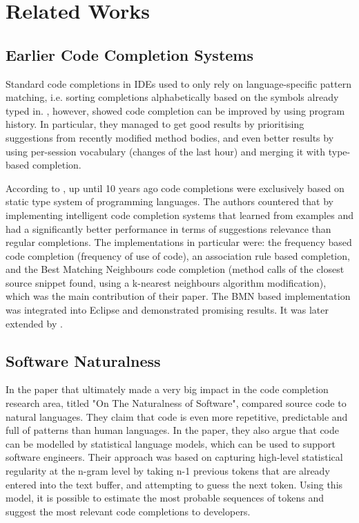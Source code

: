 \chapter{Related Works}
\label{chap:RelatedWorks}

\section{Earlier Code Completion Systems}
\label{sec:RelatedWorks-EarlierSystems}
Standard code completions in IDEs used to only rely on language-specific pattern matching, i.e. sorting completions alphabetically based on the symbols already typed in. \cite{Robb08a}, however, showed code completion can be improved by using program history. In particular, they managed to get good results by prioritising suggestions from recently modified method bodies, and even better results by using per-session vocabulary (changes of the last hour) and merging it with type-based completion.

According to \cite{Bruc09a}, up until 10 years ago code completions were exclusively based on static type system of programming languages. The authors countered that by implementing intelligent code completion systems that learned from examples and had a significantly better performance in terms of suggestions relevance than regular completions. The implementations in particular were: the frequency based code completion (frequency of use of code), an association rule based completion, and the Best Matching Neighbours code completion (method calls of the closest source snippet found, using a k-nearest neighbours algorithm modification), which was the main contribution of their paper. The BMN based implementation was integrated into Eclipse and demonstrated promising results. It was later extended by \cite{Prok15a}.

\section{Software Naturalness}
\label{sec:RelatedWorks-SoftwareNaturalness}
In the paper that ultimately made a very big impact in the code completion research area, titled "On The Naturalness of Software", \cite{Hind12a} compared source code to natural languages. They claim that code is even more repetitive, predictable and full of patterns than human languages. In the paper, they also argue that code can be modelled by statistical language models, which can be used to support software engineers. Their approach was based on capturing high-level statistical regularity at the n-gram level by taking n-1 previous tokens that are already entered into the text buffer, and attempting to guess the next token. Using this model, it is possible to estimate the most probable sequences of tokens and suggest the most relevant code completions to developers.

